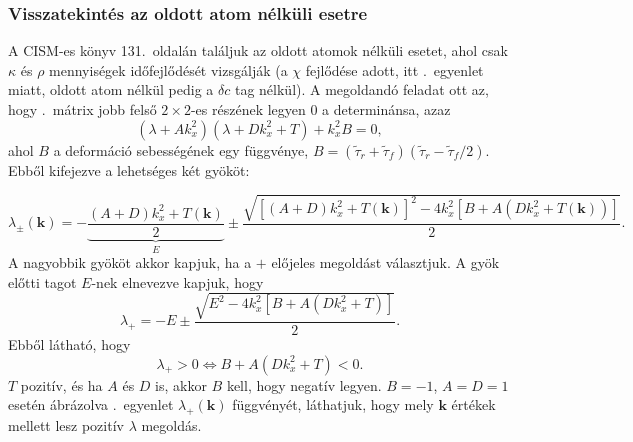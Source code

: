 \documentclass[10pt,a4paper]{scrartcl}
\let\mathbf\bm
\begin{document}
\subsubsection{Visszatekintés az oldott atom nélküli esetre}
A CISM-es könyv 131.\ oldalán találjuk az oldott atomok nélküli esetet, ahol csak $\kappa$ és $\rho$ mennyiségek időfejlődését vizsgálják (a $\chi$ fejlődése adott, itt .\ egyenlet miatt, oldott atom nélkül pedig a $\delta c$ tag nélkül). A megoldandó feladat ott az, hogy .\ mátrix jobb felső $2 \times 2$-es részének legyen 0 a determinánsa, azaz
\[\left( {\lambda  + Ak_x^2} \right)\left( {\lambda  + Dk_x^2 + T} \right) + k_x^2B = 0,\]
ahol $B$ a deformáció sebességének egy függvénye, $B = \left( {{{\tilde \tau }_r} + {{\tilde \tau }_f}} \right)\left( {{{\tilde \tau }_r} - {{\tilde \tau }_f}/2} \right)$. Ebből kifejezve a lehetséges két gyököt:

\begin{equation} \label{eq:lambda_k}
{\lambda _ \pm }\left( {\mathbf{k}} \right) =  - \underbrace {\frac{{\left( {A + D} \right)k_x^2 + T\left( {\mathbf{k}} \right)}}{2}}_E \pm \frac{{\sqrt {{{\left[ {\left( {A + D} \right)k_x^2 + T\left( {\mathbf{k}} \right)} \right]}^2} - 4k_x^2\left[ {B  + A\left( {Dk_x^2 + T\left( {\mathbf{k}} \right)} \right)} \right]} }}{2}.
\end{equation}
A nagyobbik gyököt akkor kapjuk, ha a $+$ előjeles megoldást választjuk. A gyök előtti tagot $E$-nek elnevezve kapjuk, hogy
\[{\lambda _ + } =  - E \pm \frac{{\sqrt {{E^2} - 4k_x^2\left[ {B  + A\left( {Dk_x^2 + T} \right)} \right]} }}{2}.\]
Ebből látható, hogy
\[{\lambda _ + } > 0 \Leftrightarrow B  + A\left( {Dk_x^2 + T} \right) < 0.\]
$T$ pozitív, és ha $A$ és $D$ is, akkor $B$ kell, hogy negatív legyen. $B=-1$, $A=D=1$ esetén ábrázolva .\ egyenlet ${\lambda _ + }\left( {\mathbf{k}} \right)$ függvényét, láthatjuk, hogy mely $\mathbf{k}$ értékek mellett lesz pozitív $\lambda$ megoldás.
\end{document}
